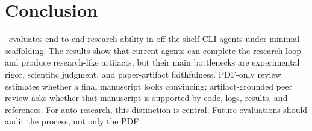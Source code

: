 \section{Conclusion}

\ra\ evaluates end-to-end research ability in off-the-shelf CLI agents under minimal scaffolding. The results show that current agents can complete the research loop and produce research-like artifacts, but their main bottlenecks are experimental rigor, scientific judgment, and paper-artifact faithfulness. PDF-only review estimates whether a final manuscript looks convincing; artifact-grounded peer review asks whether that manuscript is supported by code, logs, results, and references. For auto-research, this distinction is central. Future evaluations should audit the process, not only the PDF.
